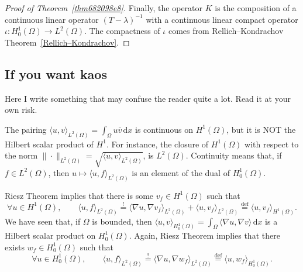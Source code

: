 \documentclass[a4paper,9pt]{amsart}
\newcommand{\C}{\mathbb{C}}	%
\newcommand{\did}{\,\mathrm{d}}	%
\newcommand{\grad}{\nabla}
\theoremstyle{plain}
\theoremstyle{definition}
\theoremstyle{remark}
\begin{document}
\begin{proof}[Proof of Theorem~\ref{thm682098e8}]
	Finally, the operator $K$ is the composition of a continuous linear operator $(T-\lambda)^{-1}$ with a continuous linear compact operator $\iota:H^1_0(\Omega)\to L^2(\Omega)$.
	The compactness of $\iota$ comes from Rellich–Kondrachov Theorem~\ref{Rellich–Kondrachov}.
%	
%	
\end{proof}

\subsection{If you want kaos}\label{subs6820b196}
Here I write something that may confuse the reader quite a lot.
Read it at your own risk.

The pairing $\langle u,v \rangle_{L^2(\Omega)} = \int_\Omega u\bar v \did x$ 
is continuous on $H^1(\Omega)$, but it is NOT the Hilbert scalar product of $H^1$.
For instance, the closure of $H^1(\Omega)$ with respect to the norm $\|\cdot\|_{L^2(\Omega)} = \sqrt{\langle u,v \rangle_{L^2(\Omega)}}$, is $L^2(\Omega)$.
Continuity means that, if $f\in L^2(\Omega)$, then $u\mapsto \langle u,f \rangle_{L^2(\Omega)}$ is an element of the dual of $H^1_0(\Omega)$.

Riesz Theorem implies that there is some $v_f\in H^1(\Omega)$ such that
\begin{equation}
	\forall u\in H^1(\Omega),\qquad
	\langle u,f \rangle_{L^2(\Omega)} 
	\overset{!}= \langle \grad u, \grad v_f \rangle_{L^2(\Omega)} + \langle u, v_f \rangle_{L^2(\Omega)} 
	\overset{\text{def}}= \langle u,v_f \rangle_{H^1(\Omega)} .
\end{equation}
We have seen that, if $\Omega$ is bounded, then $\langle u,v \rangle_{H^1_0(\Omega)} = \int_\Omega \langle \grad u,\grad v \rangle \did x$ is a Hilbert scalar product on $H^1_0(\Omega)$.
Again, Riesz Theorem implies that there exists $w_f\in H^1_0(\Omega)$ such that
\begin{equation}
	\forall u\in H^1_0(\Omega),\qquad
	\langle u,f \rangle_{L^2(\Omega)} 
	\overset{!}= \langle \grad u, \grad w_f \rangle_{L^2(\Omega)} 
	\overset{\text{def}}= \langle u,w_f \rangle_{H^1_0(\Omega)} .
\end{equation}
\end{document}
